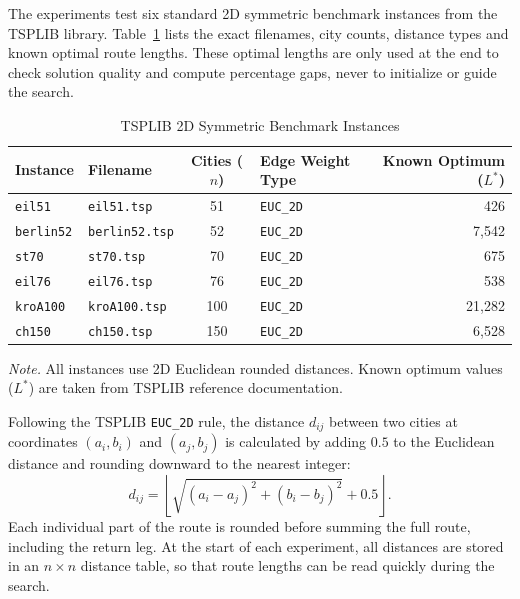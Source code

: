 The experiments test six standard 2D symmetric benchmark instances from the TSPLIB library.
Table~\ref{tab:benchmark_instances} lists the exact filenames, city counts, distance types and known optimal route lengths.
These optimal lengths are only used at the end to check solution quality and compute percentage gaps, never to initialize or guide the search.

\begin{table}[htbp]
\caption{TSPLIB 2D Symmetric Benchmark Instances}
\label{tab:benchmark_instances}
\begin{threeparttable}
\begin{tabular}{llclr}
\toprule
Instance & Filename & Cities (\(n\)) & Edge Weight Type & Known Optimum (\(L^*\)) \\
\midrule
\texttt{eil51}    & \texttt{eil51.tsp}    & 51  & \texttt{EUC\_2D} & 426 \\
\texttt{berlin52} & \texttt{berlin52.tsp} & 52  & \texttt{EUC\_2D} & 7,542 \\
\texttt{st70}     & \texttt{st70.tsp}     & 70  & \texttt{EUC\_2D} & 675 \\
\texttt{eil76}    & \texttt{eil76.tsp}    & 76  & \texttt{EUC\_2D} & 538 \\
\texttt{kroA100}  & \texttt{kroA100.tsp}  & 100 & \texttt{EUC\_2D} & 21,282 \\
\texttt{ch150}    & \texttt{ch150.tsp}    & 150 & \texttt{EUC\_2D} & 6,528 \\
\bottomrule
\end{tabular}
\begin{tablenotes}[flushleft]
\small
\item \textit{Note.} All instances use 2D Euclidean rounded distances. Known optimum values (\(L^*\)) are taken from TSPLIB reference documentation.
\end{tablenotes}
\end{threeparttable}
\end{table}

Following the TSPLIB \texttt{EUC\_2D} rule, the distance \(d_{ij}\) between two cities at coordinates \((a_i, b_i)\) and \((a_j, b_j)\) is calculated by adding \(0.5\) to the Euclidean distance and rounding downward to the nearest integer:
\begin{equation}
    d_{ij} = \left\lfloor \sqrt{(a_i - a_j)^2 + (b_i - b_j)^2} + 0.5 \right\rfloor.
\end{equation}
Each individual part of the route is rounded before summing the full route, including the return leg.
At the start of each experiment, all distances are stored in an \(n \times n\) distance table, so that route lengths can be read quickly during the search.

